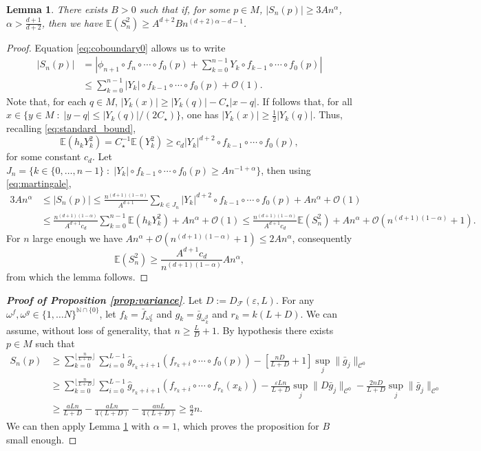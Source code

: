 \documentclass{amsart}
\numberwithin{equation}{section}
\newtheorem{lem}[thm]{Lemma}
\newcommand\cC{{\mathcal C}}
\newcommand\cF{{\mathcal F}}
\newcommand\cO{{\mathcal O}}
\newcommand\bE{{\mathbb E}}
\newcommand\bN{{\mathbb N}}
\newcommand\ve{\varepsilon}
\begin{document}
\begin{lem}\label{lem:l2-bound} There exists $B>0$ such that if, for some $p\in M$,  $|S_n(p)|\geq 3An^\alpha$, $\alpha> \frac{d+1}{d+2}$, then we have $\bE(S_n^2)\geq A^{d+2}B n^{(d+2)\alpha-d-1}$.
\end{lem}
\begin{proof}
Equation \eqref{eq:coboundary0} allows us to write
\[
\begin{split}
|S_n(p)|&=\left|\phi_{n+1}\circ  f_{n}\circ \cdots\circ f_0(p)+\sum_{k=0}^{n-1}Y_k\circ f_{k-1}\circ \cdots\circ f_0(p)\right|\\
&\leq \sum_{k=0}^{n-1}|Y_k|\circ f_{k-1}\circ \cdots\circ f_0(p)+\cO(1).
\end{split}
\]
Note that, for each $q\in M$, $|Y_k(x)|\geq |Y_k(q)|-C_\star |x-q|$. If follows that, for all $x\in \{y\in M\;:\; |y-q|\leq |Y_k(q)|/(2C_\star)\}$, one has $|Y_k(x)| \ge \frac 12 |Y_k(q)|$. 
Thus,  recalling \eqref{eq:standard_bound},
\[
\bE(h_k Y_k^2)=  C_\star^{-1} \bE( Y_k^2)\geq  c_d|Y_k|^{d+2}\circ f_{k-1}\circ\cdots\circ f_0(p),
\]
for some constant $c_d$.
Let $J_n=\{ k \in\{0,\dots,n-1\}\;:\; |Y_k|\circ f_{k-1}\circ\cdots\circ f_0(p)\geq An^{-1+\alpha}\}$, then
using \eqref{eq:martingale},
\[
\begin{split}
3An^{\alpha}&\leq |S_n(p)|\leq \frac{  n^{(d+1)(1-\alpha)}}{A^{d+1}}\sum_{k\in J_n}|Y_k|^{d+2}\circ f_{k-1}\circ \cdots\circ f_0(p)+An^\alpha+\cO(1)\\
&\leq \frac{ n^{(d+1)(1-\alpha)}}{A^{d+1}c_d}\sum_{k=0}^{n-1}\bE(h_k Y_k^2)+An^\alpha +\cO(1)\leq   \frac{ n^{(d+1)(1-\alpha)}}{A^{d+1}c_d}\bE(S_n^2)+An^\alpha+\cO(n^{(d+1)(1-\alpha)}+1).
\end{split}
\]
For $n$ large enough we have $An^\alpha+\cO(n^{(d+1)(1-\alpha)}+1)\leq 2An^\alpha$, consequently
\[
\bE(S_n^2)\geq  \frac{A^{d+1}c_d}{ n^{(d+1)(1-\alpha)}}An^\alpha,
\]
from which the lemma follows.
\end{proof}
 
\begin{proof}[\bfseries Proof of Proposition \ref{prop:variance}]
Let $D:=D_{\cF}(\ve,L)$. For any $\omega^f,\omega^g\in\{1,\dots N\}^{\bN\cap\{0\}}$, let $f_k=\bar f_{\omega^f_k}$ and $g_k =\bar g_{\omega^g_k}$ and $r_k=k(L+D)$.  We can assume, without loss of generality, that $n\geq \frac L D +1$. By hypothesis there exists $p\in M$ such that
\[
\begin{split}
S_n(p)&\geq \sum_{k=0}^{\lfloor \frac{n}{L+D}\rfloor} \sum_{i=0}^{L-1}\hat g_{r_k+i+1}(f_{r_k+i}\circ \cdots\circ f_{0}(p))-\left[\frac{n D}{L+D}+1\right] \sup_j\| \bar g_j\|_{\cC^0}\\
&\geq \sum_{k=0}^{\lfloor \frac{n}{L+D}\rfloor} \sum_{i=0}^{L-1}\hat g_{r_k+i+1}( f_{r_{k}+i}\circ \cdots\circ f_{r_k}(x_{k}))-\frac{\ve Ln}{L+D} \sup_j\|D \bar g_j\|_{\cC^0} - \frac{2n D}{L+D} \sup_j\| \bar g_j\|_{\cC^0} \\
&\geq \frac{aL n}{L+D}-\frac{a Ln}{4(L+D)}-\frac{anL}{4(L+D)}\geq \frac{ a}{2} n.
\end{split}
\]
We can then apply Lemma \ref{lem:l2-bound} with $\alpha=1$, which proves the proposition for $B$ small enough.
\end{proof}
\end{document}

